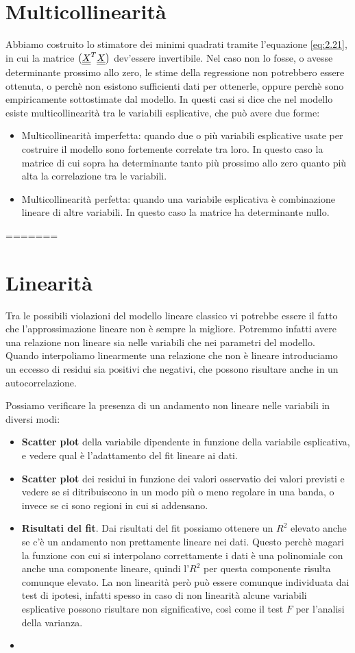 \section{Multicollinearità}
Abbiamo costruito lo stimatore dei minimi quadrati tramite l'equazione \ref{eq:2.21}, in cui la matrice $ \left(\underline{\underline{X}}^T \underline{\underline{X}}\right) $ dev'essere invertibile. Nel caso non lo fosse, o avesse determinante prossimo allo zero, le stime della regressione non potrebbero essere ottenuta, o perchè non esistono sufficienti dati per ottenerle, oppure perchè sono empiricamente sottostimate dal modello. In questi casi si dice che nel modello esiste multicollinearità tra le variabili esplicative, che può avere due forme:
\begin{itemize}
	\item Multicollinearità imperfetta: quando due o più variabili esplicative usate per costruire il modello sono fortemente correlate tra loro. In questo caso la matrice di cui sopra ha determinante tanto più prossimo allo zero quanto più alta la correlazione tra le variabili.
	\item Multicollinearità perfetta: quando una variabile esplicativa è combinazione lineare di altre variabili. In questo caso la matrice ha determinante nullo.
\end{itemize}
=======
\section{Linearità}
Tra le possibili violazioni del modello lineare classico vi potrebbe essere il fatto che l'approssimazione lineare non è sempre la migliore. Potremmo infatti avere una relazione non lineare sia nelle variabili che nei parametri del modello. Quando interpoliamo linearmente una relazione che non è lineare introduciamo un eccesso di residui sia positivi che negativi, che possono risultare anche in un autocorrelazione.

Possiamo verificare la presenza di un andamento non lineare nelle variabili in diversi modi:
\begin{itemize}
	\item \textbf{Scatter plot} della variabile dipendente in funzione della variabile esplicativa, e vedere qual è l'adattamento del fit lineare ai dati.
	\item \textbf{Scatter plot} dei residui in funzione dei valori osservatio dei valori previsti e vedere se si ditribuiscono in un modo più o meno regolare in una banda, o invece se ci sono regioni in cui si addensano.
	\item \textbf{Risultati del fit}. Dai risultati del fit possiamo ottenere un $R^2$ elevato anche se c'è un andamento non prettamente lineare nei dati. Questo perchè magari la funzione con cui si interpolano correttamente i dati è una polinomiale con anche una componente lineare, quindi l'$R^2$ per questa componente risulta comunque elevato. La non linearità però può essere comunque individuata dai test di ipotesi, infatti spesso in caso di non linearità alcune variabili esplicative possono risultare non significative, così come il test $F$ per l'analisi della varianza.
	\item 
\end{itemize}

